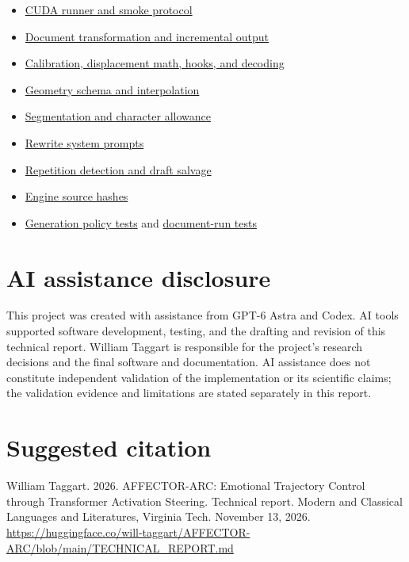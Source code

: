 \documentclass[manuscript,screen,nonacm]{acmart}
\providecommand{\tightlist}{\setlength{\itemsep}{0pt}\setlength{\parskip}{0pt}}
\begin{document}
\begin{itemize}
\tightlist
\item
  \href{https://huggingface.co/will-taggart/AFFECTOR-ARC/blob/main/run_arc.py}{CUDA
  runner and smoke protocol}
\item
  \href{https://huggingface.co/will-taggart/AFFECTOR-ARC/blob/main/document_run.py}{Document
  transformation and incremental output}
\item
  \href{https://huggingface.co/will-taggart/AFFECTOR-ARC/blob/main/engine/steering.py}{Calibration,
  displacement math, hooks, and decoding}
\item
  \href{https://huggingface.co/will-taggart/AFFECTOR-ARC/blob/main/engine/geometry.py}{Geometry
  schema and interpolation}
\item
  \href{https://huggingface.co/will-taggart/AFFECTOR-ARC/blob/main/engine/documents.py}{Segmentation
  and character allowance}
\item
  \href{https://huggingface.co/will-taggart/AFFECTOR-ARC/blob/main/engine/rewrite_policy.py}{Rewrite
  system prompts}
\item
  \href{https://huggingface.co/will-taggart/AFFECTOR-ARC/blob/main/engine/generation.py}{Repetition
  detection and draft salvage}
\item
  \href{https://huggingface.co/will-taggart/AFFECTOR-ARC/blob/main/ENGINE_MANIFEST.json}{Engine
  source hashes}
\item
  \href{https://huggingface.co/will-taggart/AFFECTOR-ARC/blob/main/tests/test_generation.py}{Generation
  policy tests} and
  \href{https://huggingface.co/will-taggart/AFFECTOR-ARC/blob/main/tests/test_document_run.py}{document-run
  tests}
\end{itemize}

\section*{AI assistance disclosure}
This project was created with assistance from GPT-6 Astra and Codex. AI
tools supported software development, testing, and the drafting and
revision of this technical report. William Taggart is responsible for
the project's research decisions and the final software and
documentation. AI assistance does not constitute independent validation
of the implementation or its scientific claims; the validation evidence
and limitations are stated separately in this report.




\section*{Suggested citation}
William Taggart. 2026. AFFECTOR-ARC: Emotional Trajectory Control
through Transformer Activation Steering. Technical report. Modern and
Classical Languages and Literatures, Virginia Tech. November 13, 2026.
\url{https://huggingface.co/will-taggart/AFFECTOR-ARC/blob/main/TECHNICAL_REPORT.md}
\end{document}
